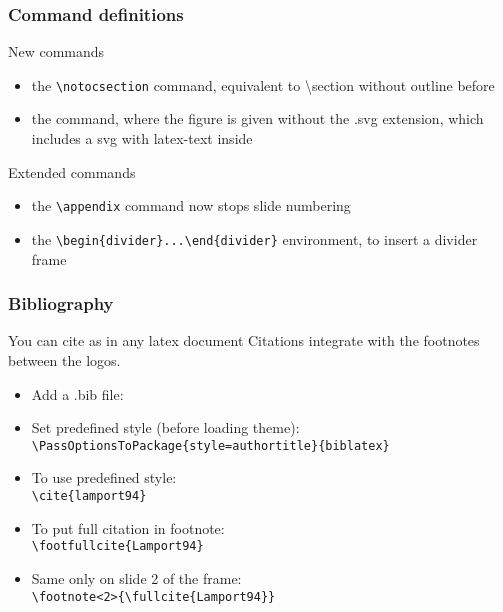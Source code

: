 \documentclass[aspectratio=169,c,12pt]{beamer}
\begin{document}
\begin{frame}[fragile]
	\frametitle{Command definitions}
	\begin{block}{New commands}
		\begin{itemize}
			\item the \verb|\notocsection| command, equivalent to \textbackslash section without outline before
			\item the \verb|| command, where the figure is given without the .svg extension, which includes a svg with latex-text inside
		\end{itemize}
	\end{block}
	\pause
	\begin{block}{Extended commands}
		\begin{itemize}
			\item the \verb|\appendix| command now stops slide numbering
			\item the \verb|\begin{divider}...\end{divider}| environment, to insert a divider frame
		\end{itemize}
	\end{block}
\end{frame}

\begin{frame}[fragile]
	\frametitle{Bibliography}
	\begin{block}{You can cite as in any latex document}
		Citations integrate with the footnotes between the logos.
		\begin{itemize}
			\item Add a .bib file: \\ \verb||
			\item Set predefined style (before loading theme): \\ \verb|\PassOptionsToPackage{style=authortitle}{biblatex}|
			\item To use predefined style: \\ \verb|\cite{lamport94}|
			\item To put full citation in footnote: \\ \verb|\footfullcite{Lamport94}|
			\item Same only on slide 2 of the frame: \\ \verb|\footnote<2>{\fullcite{Lamport94}}|
		\end{itemize}
	\end{block}
\end{frame}
\end{document}

